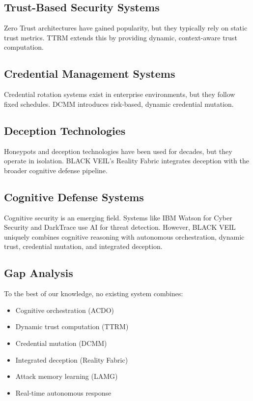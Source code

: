 \documentclass[conference]{IEEEtran}
\begin{document}
\subsection{Trust-Based Security Systems}
Zero Trust architectures \cite{zerotrust} have gained popularity, but they typically rely on static trust metrics. TTRM extends this by providing dynamic, context-aware trust computation.

\subsection{Credential Management Systems}
Credential rotation systems exist in enterprise environments, but they follow fixed schedules. DCMM introduces risk-based, dynamic credential mutation.

\subsection{Deception Technologies}
Honeypots and deception technologies have been used for decades, but they operate in isolation. BLACK VEIL's Reality Fabric integrates deception with the broader cognitive defense pipeline.

\subsection{Cognitive Defense Systems}
Cognitive security is an emerging field. Systems like IBM Watson for Cyber Security \cite{watson} and DarkTrace \cite{darktrace} use AI for threat detection. However, BLACK VEIL uniquely combines cognitive reasoning with autonomous orchestration, dynamic trust, credential mutation, and integrated deception.

\subsection{Gap Analysis}
To the best of our knowledge, no existing system combines:
\begin{itemize}
    \item Cognitive orchestration (ACDO)
    \item Dynamic trust computation (TTRM)
    \item Credential mutation (DCMM)
    \item Integrated deception (Reality Fabric)
    \item Attack memory learning (LAMG)
    \item Real-time autonomous response
\end{itemize}
\end{document}
